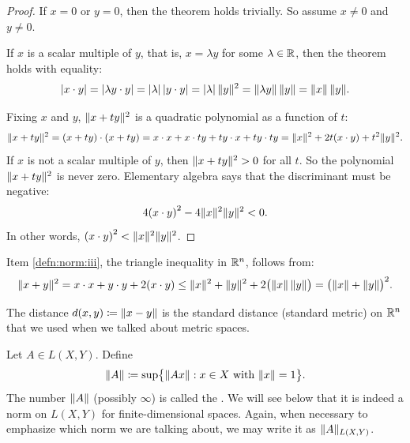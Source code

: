 \begin{proof}
If $x=0$ or $y = 0$, then the theorem holds trivially.
So assume $x \neq 0$ and $y \neq 0$.

If $x$ is a scalar multiple of $y$, that is, $x = \lambda y$ for some
$\lambda \in {\mathbb{R}}$, then the theorem holds with equality:
\begin{equation*}
\lvert { x \cdot y } \rvert =
\lvert {\lambda y \cdot y} \rvert = \lvert {\lambda} \rvert \, \lvert {y\cdot y} \rvert =
\lvert {\lambda} \rvert \, \lVert {y} \rVert^2 = \lVert {\lambda y} \rVert \, \lVert {y} \rVert
= \lVert {x} \rVert \, \lVert {y} \rVert .
\end{equation*}

Fixing $x$ and $y$,
$\lVert {x+ty} \rVert^2$
is a quadratic polynomial
as a function of $t$:
\begin{equation*}
\lVert {x+ty} \rVert^2
=
(x+ty) \cdot (x+ty)
=
x \cdot x + x \cdot ty + ty \cdot x + ty \cdot ty
=
\lVert {x} \rVert^2 + 2t(x \cdot y) + t^2 \lVert {y} \rVert^2 .
\end{equation*}
If $x$ is not a scalar multiple of $y$, then 
$\lVert {x+ty} \rVert^2 > 0$ for all $t$.  So the polynomial $\lVert {x+ty} \rVert^2$
is never zero.
Elementary algebra says that the discriminant must be negative:
\begin{equation*}
4 {(x \cdot y)}^2 - 4 \lVert {x} \rVert^2\lVert {y} \rVert^2 < 0.
\end{equation*}
In other words, ${(x \cdot y)}^2 < \lVert {x} \rVert^2\lVert {y} \rVert^2$.
\end{proof}

Item \ref{defn:norm:iii}, the triangle inequality in ${\mathbb{R}}^n$,
follows from:
\begin{equation*}
\lVert {x+y} \rVert^2 
=
x \cdot x + y \cdot y + 2 (x \cdot y)
\leq
\lVert {x} \rVert^2 + \lVert {y} \rVert^2 + 2 \bigl(\lVert {x} \rVert \,\lVert {y} \rVert\bigr)
=
{\bigl(\lVert {x} \rVert + \lVert {y} \rVert\bigr)}^2 .
\end{equation*}

The distance
$d(x,y) \coloneqq \lVert {x-y} \rVert$ is the standard
distance (standard metric) on ${\mathbb{R}}^n$ that
we used when we talked about metric spaces.

\begin{defn}
Let $A \in L(X,Y)$.  Define
\begin{equation*}
\lVert {A} \rVert \coloneqq
\sup \bigl\{ \lVert {Ax} \rVert : x \in X \text{ with } \lVert {x} \rVert = 1 \bigr\} .
\end{equation*}
The number $\lVert {A} \rVert$ (possibly $\infty$)
is called the \emph{}.  We will see below
that it is indeed a norm on $L(X,Y)$ for finite-dimensional spaces.
Again, when necessary to emphasize which norm we are talking about, we may
write it as $\lVert {A} \rVert_{L(X,Y)}$.
\end{defn}

